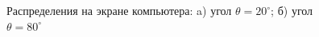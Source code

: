 	\newpage
	
	\begin{figure}[h]
		\begin{minipage}[h]{0.49\linewidth}
		\end{minipage}
		\hfill
		\begin{minipage}[h]{0.49\linewidth}
		\end{minipage}
		\caption{Распределения на экране компьютера: a) угол $\theta = 20^\circ$; б) угол $\theta = 80^\circ$}
	\end{figure}

